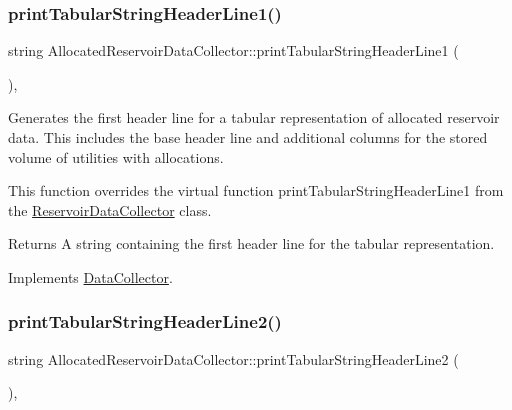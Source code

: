 \subsubsection{\texorpdfstring{print\+Tabular\+String\+Header\+Line1()}{printTabularStringHeaderLine1()}}
{\footnotesize\ttfamily string Allocated\+Reservoir\+Data\+Collector\+::print\+Tabular\+String\+Header\+Line1 (\begin{DoxyParamCaption}{ }\end{DoxyParamCaption})\hspace{0.3cm}{\ttfamily [override]}, {\ttfamily [virtual]}}



Generates the first header line for a tabular representation of allocated reservoir data. This includes the base header line and additional columns for the stored volume of utilities with allocations. 

This function overrides the virtual function {\ttfamily print\+Tabular\+String\+Header\+Line1} from the {\ttfamily \mbox{\hyperlink{classReservoirDataCollector}{Reservoir\+Data\+Collector}}} class.

\begin{DoxyReturn}{Returns}
A string containing the first header line for the tabular representation. 
\end{DoxyReturn}


Implements \mbox{\hyperlink{classDataCollector_a91619cfa9e9b8cefd2f7c20d5718b41e}{Data\+Collector}}.

\mbox{\label{classAllocatedReservoirDataCollector_a30d8c59205862822f6548472ba62e537}} 
\subsubsection{\texorpdfstring{print\+Tabular\+String\+Header\+Line2()}{printTabularStringHeaderLine2()}}
{\footnotesize\ttfamily string Allocated\+Reservoir\+Data\+Collector\+::print\+Tabular\+String\+Header\+Line2 (\begin{DoxyParamCaption}{ }\end{DoxyParamCaption})\hspace{0.3cm}{\ttfamily [override]}, {\ttfamily [virtual]}}



